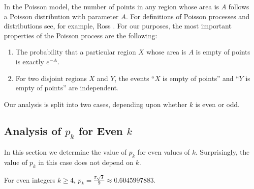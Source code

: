 \documentclass{patmorin}
\begin{document}
In the Poisson model, the number of points in any region whose
area is $A$ follows a Poisson distribution with parameter $A$.  For
definitions of Poisson processes and distributions see, for example,
Ross \cite[Chapter~2]{ross:introduction}.  For our purposes, the most
important properties of the Poisson process are the following:
\begin{enumerate}
\item The probability  that a particular region $X$ whose area is $A$
   is empty of points is exactly $e^{-A}$.
\item For two disjoint regions $X$ and $Y$, the events ``$X$ is empty
   of points'' and ``$Y$ is empty of points'' are independent.
\end{enumerate}
Our analysis is split into two cases, depending upon whether $k$ is even
or odd.


\subsection{Analysis of $p_k$ for Even $k$}

In this section we determine the value of $p_k$ for even values of $k$.
Surprisingly, the value of $p_k$ in this case does not depend on $k$.

\begin{lem}
 For even integers $k\ge 4$, $p_k=\frac{\pi\sqrt{3}}{9}\approx 0.6045997883$.
\end{lem}
\end{document}
